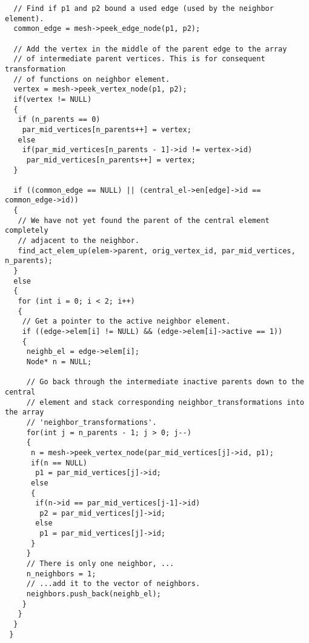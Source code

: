 \begin{lstlisting}
  // Find if p1 and p2 bound a used edge (used by the neighbor element).
  common_edge = mesh->peek_edge_node(p1, p2);

  // Add the vertex in the middle of the parent edge to the array
  // of intermediate parent vertices. This is for consequent transformation
  // of functions on neighbor element.
  vertex = mesh->peek_vertex_node(p1, p2);
  if(vertex != NULL)
  {
   if (n_parents == 0)
    par_mid_vertices[n_parents++] = vertex;
   else
    if(par_mid_vertices[n_parents - 1]->id != vertex->id)
     par_mid_vertices[n_parents++] = vertex;
  }

  if ((common_edge == NULL) || (central_el->en[edge]->id == common_edge->id))
  {
   // We have not yet found the parent of the central element completely
   // adjacent to the neighbor.
   find_act_elem_up(elem->parent, orig_vertex_id, par_mid_vertices, n_parents);
  }
  else
  {
   for (int i = 0; i < 2; i++)
   {
    // Get a pointer to the active neighbor element.
    if ((edge->elem[i] != NULL) && (edge->elem[i]->active == 1))
    {
     neighb_el = edge->elem[i];
     Node* n = NULL;

     // Go back through the intermediate inactive parents down to the central
     // element and stack corresponding neighbor_transformations into the array
     // 'neighbor_transformations'.
     for(int j = n_parents - 1; j > 0; j--)
     {
      n = mesh->peek_vertex_node(par_mid_vertices[j]->id, p1);
      if(n == NULL)
       p1 = par_mid_vertices[j]->id;
      else
      {
       if(n->id == par_mid_vertices[j-1]->id)
        p2 = par_mid_vertices[j]->id;
       else
        p1 = par_mid_vertices[j]->id;
      }
     }
     // There is only one neighbor, ...
     n_neighbors = 1;
     // ...add it to the vector of neighbors.
     neighbors.push_back(neighb_el);
    }
   }
  }
 }


\end{lstlisting}
